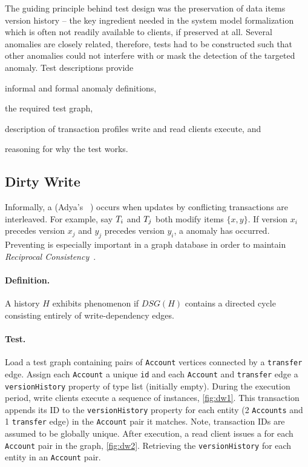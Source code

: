 The guiding principle behind test design was the preservation of data items
version history -- the key ingredient needed in the system model formalization
which is often not readily available to clients, if preserved at all. Several
anomalies are closely related, therefore, tests had to be constructed such that
other anomalies could not interfere with or mask the detection of the targeted
anomaly. Test descriptions provide
\begin{enumerate*}[label={(\roman*)}]
  \item informal and formal anomaly definitions,
  \item the required test graph,
  \item description of transaction profiles write and read clients execute, and
  \item reasoning for why the test works.
\end{enumerate*}


\subsection{Dirty Write}
\label{sec:dirty-write}

Informally, a  (Adya's ~\cite{adya1999weak})
occurs when updates by conflicting transactions are interleaved. For example,
say $T_i$ and $T_j$ both modify items $\{x,y\}$. If version $x_i$
precedes version $x_j$ and $y_j$ precedes version $y_i$, a  anomaly
has occurred. Preventing  is especially important in a graph
database in order to maintain \emph{Reciprocal Consistency}~\cite{Waudby2020}.

\paragraph{Definition.}
A history $H$ exhibits phenomenon  if $\textit{DSG}(H)$ contains a
directed cycle consisting entirely of write-dependency edges.

\paragraph{Test.}
Load a test graph containing pairs of \texttt{Account} vertices connected by a
\texttt{transfer} edge. Assign each \texttt{Account} a unique \texttt{id} and
each \texttt{Account} and \texttt{transfer} edge a \texttt{versionHistory}
property of type list (initially empty). During the execution period, write
clients execute a sequence of  instances, \autoref{fig:dw1}.
This transaction appends its ID to the \texttt{versionHistory} property for each
entity (2 \texttt{Accounts} and 1 \texttt{transfer} edge) in the \texttt{Account}
pair it matches. Note, transaction IDs are assumed to be globally unique. After
execution, a read client issues a  for each
\texttt{Account} pair in the graph, \autoref{fig:dw2}. Retrieving the
\texttt{versionHistory} for each entity in an \texttt{Account} pair.

